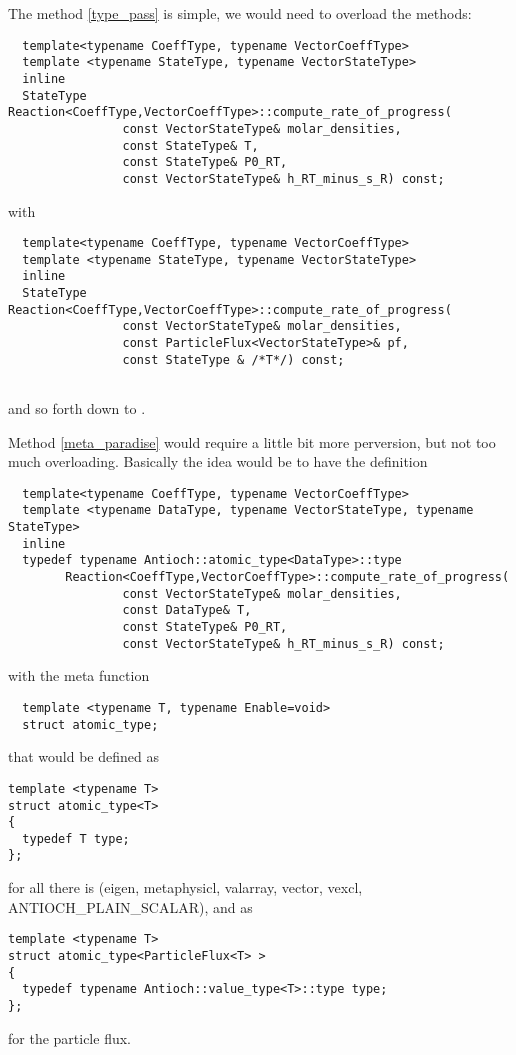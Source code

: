 The method \ref{type_pass} is simple, we would need to overload the methods:
\begin{verbatim}
  template<typename CoeffType, typename VectorCoeffType>
  template <typename StateType, typename VectorStateType>
  inline
  StateType Reaction<CoeffType,VectorCoeffType>::compute_rate_of_progress( 
                const VectorStateType& molar_densities,
                const StateType& T,  
                const StateType& P0_RT,  
                const VectorStateType& h_RT_minus_s_R) const;
\end{verbatim}
with
\begin{verbatim}
  template<typename CoeffType, typename VectorCoeffType>
  template <typename StateType, typename VectorStateType>
  inline
  StateType Reaction<CoeffType,VectorCoeffType>::compute_rate_of_progress( 
                const VectorStateType& molar_densities,
                const ParticleFlux<VectorStateType>& pf,
                const StateType & /*T*/) const;
                
\end{verbatim}
and so forth down to \KineticsType.

Method \ref{meta_paradise} would require a little bit more perversion, but not
too much overloading. Basically the idea would be to have the definition
\begin{verbatim}
  template<typename CoeffType, typename VectorCoeffType>
  template <typename DataType, typename VectorStateType, typename StateType>
  inline
  typedef typename Antioch::atomic_type<DataType>::type
        Reaction<CoeffType,VectorCoeffType>::compute_rate_of_progress( 
                const VectorStateType& molar_densities,
                const DataType& T,  
                const StateType& P0_RT,  
                const VectorStateType& h_RT_minus_s_R) const;
\end{verbatim}
with the meta function
\begin{verbatim}
  template <typename T, typename Enable=void>
  struct atomic_type;
\end{verbatim}
that would be defined as
\begin{verbatim}
template <typename T>
struct atomic_type<T>
{
  typedef T type;
};
\end{verbatim}
for all there is (eigen, metaphysicl, valarray, vector, vexcl, ANTIOCH\_PLAIN\_SCALAR), and
as
\begin{verbatim}
template <typename T>
struct atomic_type<ParticleFlux<T> >
{
  typedef typename Antioch::value_type<T>::type type;
};
\end{verbatim}
for the particle flux.

